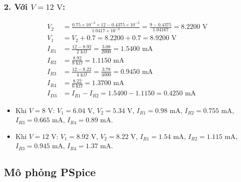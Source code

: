 \subsubsection*{2. Với $V = 12\text{ V}$:}
\begin{align*}
  V_2 &= \frac{0.75 \times 10^{-3} \times 12 - 0.4375 \times 10^{-3}}{1.0417 \times 10^{-3}} = \frac{9 - 0.4375}{1.04167} = 8.2200\text{ V} \\
  V_1 &= V_2 + 0.7 = 8.2200 + 0.7 = 8.9200\text{ V} \\
  I_{R1} &= \frac{12 - 8.92}{2\text{ k}\Omega} = \frac{3.08}{2000} = 1.5400\text{ mA} \\
  I_{R2} &= \frac{8.92}{8\text{ k}\Omega} = 1.1150\text{ mA} \\
  I_{R3} &= \frac{12 - 8.22}{4\text{ k}\Omega} = \frac{3.78}{4000} = 0.9450\text{ mA} \\
  I_{R4} &= \frac{8.22}{6\text{ k}\Omega} = 1.3700\text{ mA} \\
  I_{D3} &= I_{R1} - I_{R2} = 1.5400 - 1.1150 = 0.4250\text{ mA}
\end{align*}

\begin{dapsobox}
  \begin{itemize}[leftmargin=1.5em]
    \item Khi $V = 8\text{ V}$: $V_1 = 6.04\text{ V}$, $V_2 = 5.34\text{ V}$, $I_{R1} = 0.98\text{ mA}$, $I_{R2} = 0.755\text{ mA}$, $I_{R3} = 0.665\text{ mA}$, $I_{R4} = 0.89\text{ mA}$.
    \item Khi $V = 12\text{ V}$: $V_1 = 8.92\text{ V}$, $V_2 = 8.22\text{ V}$, $I_{R1} = 1.54\text{ mA}$, $I_{R2} = 1.115\text{ mA}$, $I_{R3} = 0.945\text{ mA}$, $I_{R4} = 1.37\text{ mA}$.
  \end{itemize}
\end{dapsobox}

\Needspace{0.66\textheight}
\subsection{Mô phỏng PSpice}
\simresult
{}

